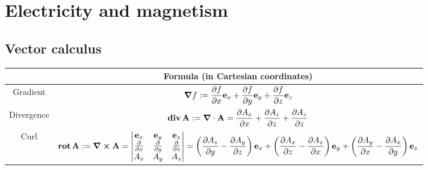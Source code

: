 \documentclass[../../../main.tex]{subfiles}
\begin{document}
\renewcommand{\col}{\phy}
\section{Electricity and magnetism}
\subsection{Vector calculus}
\begin{center}
  \begin{tabular}{|c|c|}

    \hline
               & Formula (in Cartesian coordinates)                                                                                                                                                                                                                                                                                             \\
    \hline
    Gradient   & $\displaystyle\grad f:=\frac{\partial f}{\partial x}\boldsymbol{\mathrm{e}}_x+\frac{\partial f}{\partial y}\boldsymbol{\mathrm{e}}_y+\frac{\partial f}{\partial z}\boldsymbol{\mathrm{e}}_z$                                                                                                                                                                                      \\
    \hline
    Divergence & $\displaystyle\operatorname{\boldsymbol{\mathrm{div}}} \boldsymbol{\mathrm{A}}:=\grad\cdot\boldsymbol{\mathrm{A}}=\frac{\partial A_x}{\partial x}+\frac{\partial A_z}{\partial z}+\frac{\partial A_z}{\partial z}$                                                                                                                                                                                   \\
    \hline
    Curl       & $\displaystyle\rot \vf{A}:=\grad\crossprod\vf{A}=\begin{vmatrix}
                                                                      \vf{e}_x                    & \vf{e}_y                    & \vf{e}_z                    \\
                                                                      \frac{\partial}{\partial x} & \frac{\partial}{\partial y} & \frac{\partial}{\partial z} \\
                                                                      A_x                         & A_y                         & A_z                         \\
                                                                    \end{vmatrix}=\left(\frac{\partial A_z}{\partial y}-\frac{\partial A_y}{\partial z}\right)\vf{e}_x+\left(\frac{\partial A_x}{\partial z}-\frac{\partial A_z}{\partial x}\right)\vf{e}_y+\left(\frac{\partial A_y}{\partial x}-\frac{\partial A_x}{\partial y}\right)\vf{e}_z$ \\

\end{tabular}
\end{center}
\end{document}

